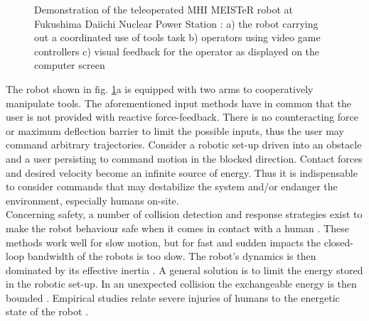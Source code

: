 \documentclass[a4paper,twoside, openright,12pt]{report}
\begin{document}
\begin{figure}
	\centering
	\caption[Demonstration of MHI MEISTeR at Fukushima Daiichi NPS]{Demonstration of the teleoperated MHI MEISTeR robot at Fukushima Daiichi Nuclear Power Station \cite{MHI-MEISTeR}: a) the robot carrying out a coordinated use of tools task b) operators using video game controllers c) visual feedback for the operator as displayed on the computer screen}
	\label{FIG:MEISTeR}
	\vspace{-10pt}
\end{figure}
 The robot shown in fig. \ref{FIG:MEISTeR}a is equipped with two arms to cooperatively manipulate tools.  The aforementioned input methods have in common that the user is not provided with reactive force-feedback. There is no counteracting force or maximum deflection barrier to limit the possible inputs, thus the user may command arbitrary trajectories. Consider a robotic set-up driven into an obstacle and a user persisting to command motion in the blocked direction. Contact forces and desired velocity become an infinite source of energy. Thus it is indispensable to consider commands that may destabilize the system and/or endanger the environment, especially humans on-site.\\
Concerning safety, a number of collision detection and response strategies exist to make the robot behaviour safe when it comes in contact with a human \cite{Haddadin_14}. These methods work well for slow motion, but for fast and sudden impacts the closed-loop bandwidth of the robots is too slow. The robot's dynamics is then dominated by its effective inertia \cite{Laffranchi_12}. A general solution is to limit the energy stored in the robotic set-up. In an unexpected collision the exchangeable energy is then bounded \cite{Tadele_14}. Empirical studies relate severe injuries of humans to the energetic state of the robot \cite{Wood_71,Yoganandan_96}.\\
\end{document}
